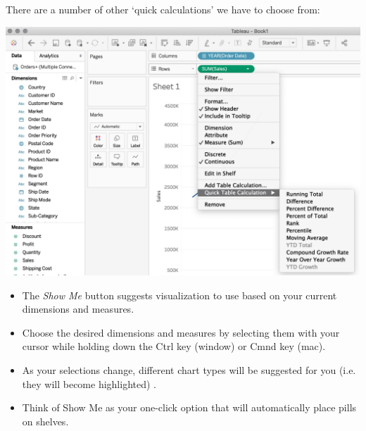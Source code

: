 \documentclass[xcolor=svgnames]{beamer} %
\begin{document}
\begin{frame}
There are a number of other `quick calculations' we have to choose from:
\begin{center}
\includegraphics[width=.85\textwidth]{img/quickCalcs}
\end{center}

\end{frame}


\begin{frame}[fragile]

\begin{itemize}
\item The \emph{Show Me} button suggests visualization to use based on your current dimensions and measures.\vfill

\item Choose the desired dimensions and measures by selecting them with your cursor while holding down the {Ctrl} key (window) or Cmnd key (mac).\vfill

\item As your selections change, different chart types will be suggested for you (i.e. they will become highlighted) .\vfill

\item Think of Show Me as your one-click option that will automatically place pills on shelves.
\end{itemize}
\end{frame}
\end{document}
